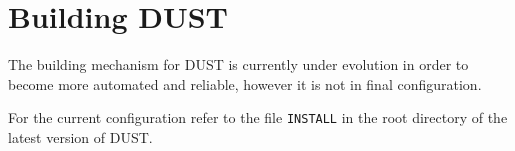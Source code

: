 \chapter{Building DUST}
The building mechanism for DUST is currently under evolution in order to become 
more automated and reliable, however it is not in final configuration. 

For the current configuration refer to the file \texttt{INSTALL} in the root directory 
of the latest version of DUST.